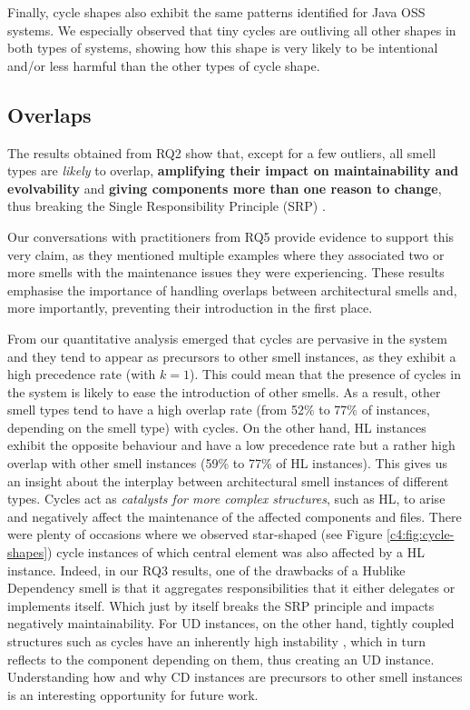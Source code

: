 Finally, cycle shapes also exhibit the same patterns identified for Java OSS systems.
We especially observed that tiny cycles are outliving all other shapes in both types of systems, showing how this shape is very likely to be intentional and/or less harmful than the other types of cycle shape.

\subsection{Overlaps}
The results obtained from RQ2 show that, except for a few outliers, all smell types are \emph{likely} to overlap, \textbf{amplifying their impact on maintainability and evolvability} and \textbf{giving components more than one reason to change}, thus breaking the Single Responsibility Principle (SRP) \cite{Martin2018}. 

Our conversations with practitioners from RQ5 provide evidence to support this very claim, as they mentioned multiple examples where they associated two or more smells with the maintenance issues they were experiencing.
These results emphasise the importance of handling overlaps between architectural smells and, more importantly, preventing their introduction in the first place.

From our quantitative analysis emerged that cycles are pervasive in the system and they tend to appear as precursors to other smell instances, as they exhibit a high precedence rate (with $k = 1$).
This could mean that the presence of cycles in the system is likely to ease the introduction of other smells.
As a result, other smell types tend to have a high overlap rate (from 52\% to 77\% of instances, depending on the smell type) with cycles.
On the other hand, HL instances exhibit the opposite behaviour and have a low precedence rate but a rather high overlap with other smell instances (59\% to 77\% of HL instances).
This gives us an insight about the interplay between architectural smell instances of different types.
Cycles act as \emph{catalysts for more complex structures}, such as HL, to arise and negatively affect the maintenance of the affected components and files.
There were plenty of occasions where we observed star-shaped (see Figure \ref{c4:fig:cycle-shapes}) cycle instances of which central element was also affected by a HL instance.
Indeed, in our RQ3 results, one of the drawbacks of a Hublike Dependency smell is that it aggregates responsibilities that it either delegates or implements itself.
Which just by itself breaks the SRP principle and impacts negatively maintainability.
For UD instances, on the other hand, tightly coupled structures such as cycles have an inherently high instability \cite{Martin2018}, which in turn reflects to the component depending on them, thus creating an UD instance.
Understanding how and why CD instances are precursors to other smell instances is an interesting opportunity for future work.

